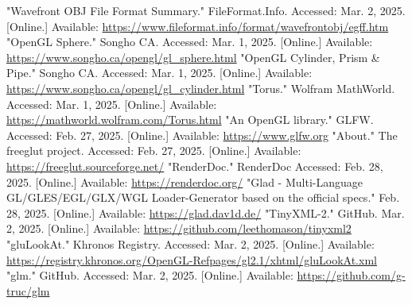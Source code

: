 \documentclass[12pt, a4paper]{article}
\begin{document}
\begin{thebibliography}{9}
        "Wavefront OBJ File Format Summary."{} FileFormat.Info. Accessed: Mar. 2, 2025. [Online.]
        Available: \url{https://www.fileformat.info/format/wavefrontobj/egff.htm}
        "OpenGL Sphere."{} Songho CA. Accessed: Mar. 1, 2025. [Online.] Available:
        \url{https://www.songho.ca/opengl/gl_sphere.html}
        "OpenGL Cylinder, Prism \& Pipe."{} Songho CA. Accessed: Mar. 1, 2025. [Online.] Available:
        \url{https://www.songho.ca/opengl/gl_cylinder.html}
        "Torus."{} Wolfram MathWorld. Accessed: Mar. 1, 2025. [Online.] Available:
        \url{https://mathworld.wolfram.com/Torus.html}
        "An OpenGL library."{} GLFW. Accessed: Feb. 27, 2025. [Online.] Available:
        \url{https://www.glfw.org}
        "About."{} The freeglut project. Accessed: Feb. 27, 2025. [Online.] Available:
        \url{https://freeglut.sourceforge.net/}
        "RenderDoc."{} RenderDoc Accessed: Feb. 28, 2025. [Online.] Available:
        \url{https://renderdoc.org/}
        "Glad - Multi-Language GL/GLES/EGL/GLX/WGL Loader-Generator based on the official specs."{}
        Feb. 28, 2025. [Online.] Available: \url{https://glad.dav1d.de/}
        "TinyXML-2."{} GitHub. Mar. 2, 2025. [Online.] Available:
        \url{https://github.com/leethomason/tinyxml2}
        "gluLookAt."{} Khronos Registry. Accessed: Mar. 2, 2025. [Online.] Available:
        \url{https://registry.khronos.org/OpenGL-Refpages/gl2.1/xhtml/gluLookAt.xml}
        "glm."{} GitHub. Accessed: Mar. 2, 2025. [Online.] Available:
        \url{https://github.com/g-truc/glm}
\end{thebibliography}
\endgroup
\end{document}
